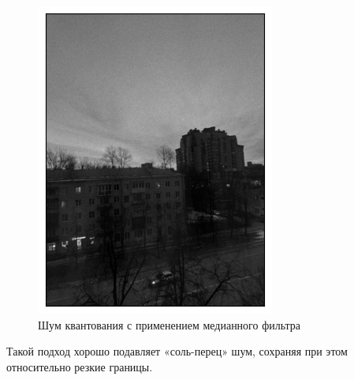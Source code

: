 \documentclass[a4paper,12pt]{article}
\begin{document}
\begin{figure}[H]
\begin{minipage}{0.49\textwidth}
                \centering \includegraphics[width=\textwidth]{results/nlf_pois_1.png}
                \caption{Шум квантования с применением медианного фильтра}
            \end{minipage}
        \end{figure}
        \noindent
Такой подход хорошо подавляет «соль-перец» шум, сохраняя при этом относительно резкие границы.
\end{document}
